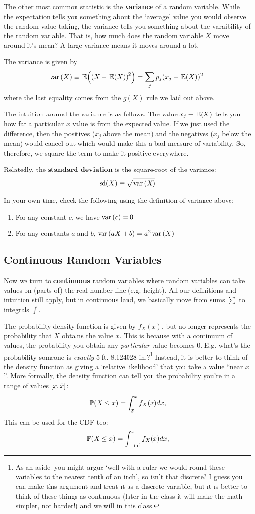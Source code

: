 \documentclass[12pt]{article}
\begin{document}
The other most common statistic is the \textbf{variance} of a random variable. While the expectation tells you something about the `average' value you would observe the random value taking, the variance tells you something about the varaibility of the random variable. That is, how much does the random variable $X$ move around it's mean? A large variance means it moves around a lot.

The variance is given by 
$$
  \var{X} \equiv \expec{\left( X - \expec{X} \right)^2 } = \sum_j p_j (x_j - \expec{X})^2,
$$
where the last equality comes from the $g(X)$ rule we laid out above. 

The intuition around the variance is as follows. The value $x_j - \expec{X}$ tells you how far a particular $x$ value is from the expected value. If we just used the difference, then the positives ($x_j$ above the mean) and the negatives ($x_j$ below the mean) would cancel out which would make this a bad measure of variability. So, therefore, we square the term to make it positive everywhere.

Relatedly, the \textbf{standard deviation} is the square-root of the variance: 
$$
  \sd{X} \equiv \sqrt{\var{X}}
$$

In your own time, check the following using the definition of variance above:
\begin{enumerate}
  \item For any constant $c$, we have $\var{c} = 0$
  
  \item For any constants $a$ and $b$, $\var{aX + b} = a^2 \var{X}$
\end{enumerate}


\subsection*{Continuous Random Variables}

Now we turn to \textbf{continuous} random variables where random variables can take values on (parts of) the real number line (e.g. height). All our definitions and intuition still apply, but in continuous land, we basically move from sums $\sum$ to integrals $\int$. 

The probability density function is given by $f_{X}(x)$, but no longer represents the probability that $X$ obtains the value $x$. This is because with a continuum of values, the probability you obtain any \emph{particular} value becomes 0. E.g. what's the probability someone is \emph{exactly} 5 ft. 8.124028 in.?\footnote{As an aside, you might argue `well with a ruler we would round these variables to the nearest tenth of an inch', so isn't that discrete? I guess you can make this argument and treat it as a discrete variable, but it is better to think of these things as continuous (later in the class it will make the math simpler, not harder!) and we will in this class.}
Instead, it is better to think of the density function as giving a `relative likelihood' that you take a value ``near $x$''. More formally, the density function can tell you the probability you're in a range of values $[\ubar{x}, \bar{x}]$: 
$$
  \P{X \leq x} = \int_{\ubar{x}}^{\bar{x}} f_{X}(x) dx,
$$
This can be used for the CDF too:
$$
  \P{X \leq x} = \int_{-\inf}^x f_{X}(x) dx,
$$
\end{document}
